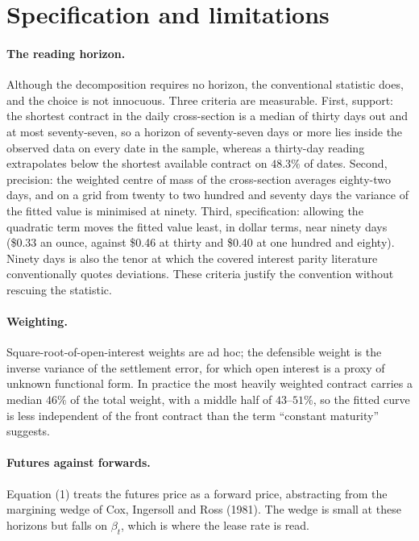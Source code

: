 \documentclass[11pt,a4paper]{article}
\begin{document}
\section{Specification and limitations}
\label{sec:robust}

\paragraph{The reading horizon.}
Although the decomposition requires no horizon, the conventional statistic
does, and the choice is not innocuous. Three criteria are measurable. First,
support: the shortest contract in the daily cross-section is a median of thirty
days out and at most seventy-seven, so a horizon of seventy-seven days or more
lies inside the observed data on every date in the sample, whereas a thirty-day
reading extrapolates below the shortest available contract on $48.3\%$ of
dates. Second, precision: the weighted centre of mass of the cross-section
averages eighty-two days, and on a grid from twenty to two hundred and seventy
days the variance of the fitted value is minimised at ninety. Third,
specification: allowing the quadratic term moves the fitted value least, in
dollar terms, near ninety days (\$0.33 an ounce, against \$0.46 at thirty and
\$0.40 at one hundred and eighty). Ninety days is also the tenor at which the
covered interest parity literature conventionally quotes deviations. These
criteria justify the convention without rescuing the statistic.

\paragraph{Weighting.}
Square-root-of-open-interest weights are ad hoc; the defensible weight is the
inverse variance of the settlement error, for which open interest is a proxy of
unknown functional form. In practice the most heavily weighted contract carries
a median $46\%$ of the total weight, with a middle half of $43$--$51\%$, so the
fitted curve is less independent of the front contract than the term
``constant maturity'' suggests.

\paragraph{Futures against forwards.}
Equation (1) treats the futures price as a forward price, abstracting from the
margining wedge of Cox, Ingersoll and Ross (1981). The wedge is small at these
horizons but falls on $\beta_t$, which is where the lease rate is read.
\end{document}
